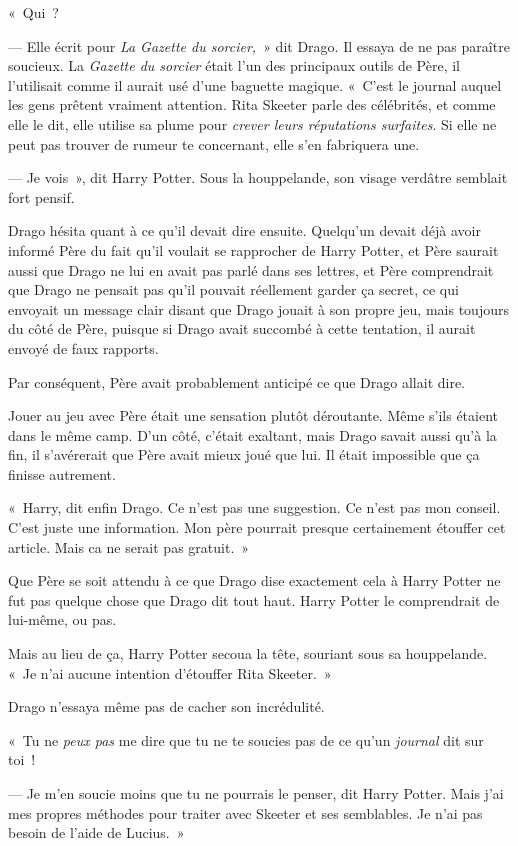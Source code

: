 «~Qui~?

--- Elle écrit pour \emph{La Gazette du sorcier,}~» dit Drago. Il essaya de ne pas paraître soucieux. La \emph{Gazette du sorcier} était l'un des principaux outils de Père, il l'utilisait comme il aurait usé d'une baguette magique. «~C'est le journal auquel les gens prêtent vraiment attention. Rita Skeeter parle des célébrités, et comme elle le dit, elle utilise sa plume pour \emph{crever leurs réputations surfaites}. Si elle ne peut pas trouver de rumeur te concernant, elle s'en fabriquera une.

--- Je vois~», dit Harry Potter. Sous la houppelande, son visage verdâtre semblait fort pensif.

Drago hésita quant à ce qu'il devait dire ensuite. Quelqu'un devait déjà avoir informé Père du fait qu'il voulait se rapprocher de Harry Potter, et Père saurait aussi que Drago ne lui en avait pas parlé dans ses lettres, et Père comprendrait que Drago ne pensait pas qu'il pouvait réellement garder ça secret, ce qui envoyait un message clair disant que Drago jouait à son propre jeu, mais toujours du côté de Père, puisque si Drago avait succombé à cette tentation, il aurait envoyé de faux rapports.

Par conséquent, Père avait probablement anticipé ce que Drago allait dire.

Jouer au jeu avec Père était une sensation plutôt déroutante. Même s'ils étaient dans le même camp. D'un côté, c'était exaltant, mais Drago savait aussi qu'à la fin, il s'avérerait que Père avait mieux joué que lui. Il était impossible que ça finisse autrement.

«~Harry, dit enfin Drago. Ce n'est pas une suggestion. Ce n'est pas mon conseil. C'est juste une information. Mon père pourrait presque certainement étouffer cet article. Mais ca ne serait pas gratuit.~»

Que Père se soit attendu à ce que Drago dise exactement cela à Harry Potter ne fut pas quelque chose que Drago dit tout haut. Harry Potter le comprendrait de lui-même, ou pas.

Mais au lieu de ça, Harry Potter secoua la tête, souriant sous sa houppelande. «~Je n'ai aucune intention d'étouffer Rita Skeeter.~»

Drago n'essaya même pas de cacher son incrédulité.

«~Tu ne \emph{peux pas} me dire que tu ne te soucies pas de ce qu'un \emph{journal} dit sur toi~!

--- Je m'en soucie moins que tu ne pourrais le penser, dit Harry Potter. Mais j'ai mes propres méthodes pour traiter avec Skeeter et ses semblables. Je n'ai pas besoin de l'aide de Lucius.~»

